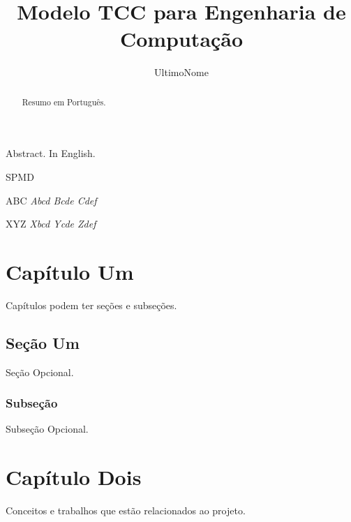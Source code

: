 \documentclass[tcc,ec]{texfurg} %
\title{Modelo TCC para Engenharia de Computação}
\author{UltimoNome}{Nome Sobrenome de}
\begin{document}

\maketitle

\sloppy

\begin{abstract}
     Resumo em Português.
\end{abstract}

\begin{englishabstract}%
  Abstract. In English.
\end{englishabstract}

\listoffigures

\listoftables

\begin{listofabbrv}{SPMD}
		\item[ABC] \textit{Abcd Bcde Cdef}
		\item[XYZ] \textit{Xbcd Ycde Zdef}
       \end{listofabbrv}

\tableofcontents

\chapter{Capítulo Um}

Capítulos podem ter seções e subseções.

\section{Seção Um} 

Seção Opcional.

\subsection{Subseção}

Subseção Opcional.

\chapter{Capítulo Dois}

Conceitos e trabalhos que estão relacionados ao projeto.
\end{document}
